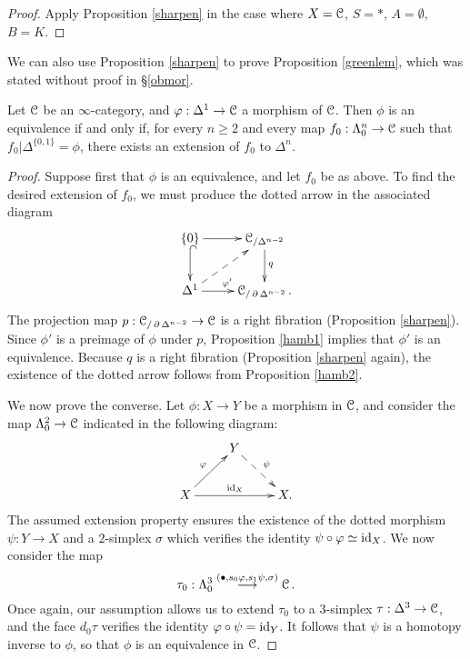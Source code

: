 \begin{proof}
Apply Proposition \ref{sharpen} in the case where $X = \operatorname{\mathcal{C}}$, $S = \ast$, $A = \emptyset$, $B = K$.
\end{proof}

We can also use Proposition \ref{sharpen} to prove Proposition \ref{greenlem}, 
which was stated without proof in \S \ref{obmor}.

\begin{proposition2}
Let $\operatorname{\mathcal{C}}$ be an $\infty$-category, and $\varphi: \Delta^1 \rightarrow \operatorname{\mathcal{C}}$ a morphism of $\operatorname{\mathcal{C}}$. Then $\phi$ is an equivalence if and only if, for every $n \geq 2$ and every map
$f_0: \Lambda^n_0 \rightarrow \operatorname{\mathcal{C}}$ such that $f_0 | \Delta^{\{0,1\}} = \phi$,
there exists an extension of $f_0$ to $\Delta^n$.
\end{proposition2}

\begin{proof}
Suppose first that $\phi$ is an equivalence, and let $f_0$ be as above. To find the desired extension of $f_0$, we must produce the dotted arrow in the associated diagram
$$ \xymatrix{ \{ 0 \} \ar@{^{(}->}[d] \ar[r] & \calC_{/ \Delta^{n-2} } \ar[d]^{q} \\
\Delta^1 \ar[r]^{\phi'} \ar@{-->}[ur] & \calC_{/ \bd \Delta^{n-2} }. }$$  
The projection map $p: \operatorname{\mathcal{C}}_{/ \operatorname{\partial} \Delta^{n-2} } \rightarrow \operatorname{\mathcal{C}}$ is a right fibration (Proposition \ref{sharpen}). Since $\phi'$ is a preimage of $\phi$ under $p$, Proposition \ref{hamb1} implies that $\phi'$ is an equivalence. Because $q$ is a right fibration (Proposition \ref{sharpen} again), 
the existence of the dotted arrow follows from Proposition \ref{hamb2}.

We now prove the converse. Let $\phi: X \rightarrow Y$ be a morphism in $\operatorname{\mathcal{C}}$,
and consider the map $\Lambda^2_0 \rightarrow \operatorname{\mathcal{C}}$ indicated in the following diagram:
$$ \xymatrix{ & Y \ar@{-->}[dr]^{\psi} & \\
X \ar[ur]^{\phi} \ar[rr]^{\id_{X}} & & X. }$$
The assumed extension property ensures the existence of the dotted morphism
$\psi: Y \rightarrow X$ and a $2$-simplex $\sigma$ which verifies the identity
$\psi \circ \varphi \simeq \operatorname{id}_{X}$. We now consider the map
$$ \tau_0: \Lambda^3_0 \stackrel{ ( \bullet, s_0 \varphi, s_1 \psi, \sigma) } \longrightarrow \operatorname{\mathcal{C}}.$$
Once again, our assumption allows us to extend $\tau_0$ to a $3$-simplex
$\tau: \Delta^3 \rightarrow \operatorname{\mathcal{C}}$, and the face $d_0 \tau$ verifies the identity
$\varphi \circ \psi = \operatorname{id}_{Y}$. It follows that $\psi$ is a homotopy inverse to $\phi$, so that
$\phi$ is an equivalence in $\operatorname{\mathcal{C}}$.
\end{proof}

